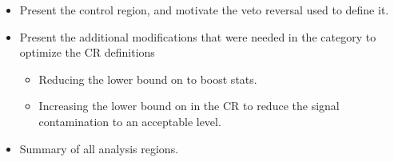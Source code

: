 \begin{itemize}
\item Present the \ttbar control region, and motivate the \bjet veto reversal used to define it.
\item Present the additional modifications that were needed in the \merged category to optimize the CR definitions
\begin{itemize}
\item Reducing the lower bound on \metsig to boost stats.
\item Increasing the lower bound on \dR in the \wjets CR to reduce the signal contamination to an acceptable level.
\end{itemize}
\item Summary of all analysis regions.
\end{itemize}

